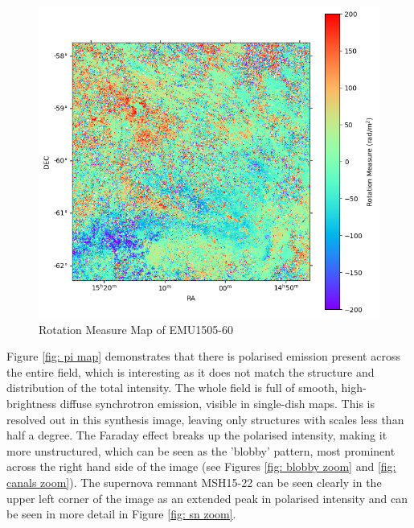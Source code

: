 \begin{figure}
    \centering
    \includegraphics[width=1\linewidth]{Thesis_Template//Figures/RM map.png}
        \caption{Rotation Measure Map of EMU1505-60}
    \label{fig: rm map}
\end{figure}

Figure \ref{fig: pi map} demonstrates that there is polarised emission present across the entire field, which is interesting as it does not match the structure and distribution of the total intensity. The whole field is full of smooth, high-brightness diffuse synchrotron emission, visible in single-dish maps. This is resolved out in this synthesis image, leaving only structures with scales less than half a degree. The Faraday effect breaks up the polarised intensity, making it more unstructured, which can be seen as the 'blobby' pattern, most prominent across the right hand side of the image (see Figures \ref{fig: blobby zoom} and \ref{fig: canals zoom}). The supernova remnant MSH15-22 can be seen clearly in the upper left corner of the image as an extended peak in polarised intensity and can be seen in more detail in Figure \ref{fig: sn zoom}.

